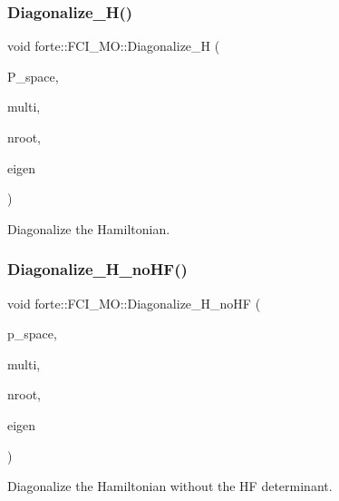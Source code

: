 \subsubsection{\texorpdfstring{Diagonalize\+\_\+\+H()}{Diagonalize\_H()}}
{\footnotesize\ttfamily void forte\+::\+F\+C\+I\+\_\+\+M\+O\+::\+Diagonalize\+\_\+H (\begin{DoxyParamCaption}\item[{const \mbox{\hyperlink{fci__mo_8h_a777ccac2de1a8940d2f654e59ff12f06}{vecdet}} \&}]{P\+\_\+space,  }\item[{const int \&}]{multi,  }\item[{const int \&}]{nroot,  }\item[{std\+::vector$<$ std\+::pair$<$ psi\+::\+Shared\+Vector, double $>$$>$ \&}]{eigen }\end{DoxyParamCaption})\hspace{0.3cm}{\ttfamily [protected]}}



Diagonalize the Hamiltonian. 

\mbox{\label{classforte_1_1_f_c_i___m_o_a8eb4d64d6f937a4885499a4871fd066f}} 
\subsubsection{\texorpdfstring{Diagonalize\+\_\+\+H\+\_\+no\+H\+F()}{Diagonalize\_H\_noHF()}}
{\footnotesize\ttfamily void forte\+::\+F\+C\+I\+\_\+\+M\+O\+::\+Diagonalize\+\_\+\+H\+\_\+no\+HF (\begin{DoxyParamCaption}\item[{const \mbox{\hyperlink{fci__mo_8h_a777ccac2de1a8940d2f654e59ff12f06}{vecdet}} \&}]{p\+\_\+space,  }\item[{const int \&}]{multi,  }\item[{const int \&}]{nroot,  }\item[{std\+::vector$<$ std\+::pair$<$ psi\+::\+Shared\+Vector, double $>$$>$ \&}]{eigen }\end{DoxyParamCaption})\hspace{0.3cm}{\ttfamily [protected]}}



Diagonalize the Hamiltonian without the HF determinant. 

